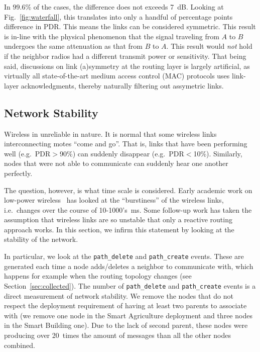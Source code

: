 \documentclass{elsarticle}
\newcommand{\building}            {Smart Building\xspace}
\newcommand{\agri}                {Smart Agriculture\xspace}
\newcommand{\pathcreate}          {{\tt path\_create}\xspace}
\newcommand{\pathdelete}          {{\tt path\_delete}\xspace}
\begin{document}
In $99.6\%$ of the cases, the difference does not exceeds 7~dB.
Looking at Fig.~\ref{fig:waterfall}, this translates into only a handful of percentage points difference in PDR.
This means the links can be considered symmetric.
This result is in-line with the physical phenomenon that the signal traveling from $A$ to $B$ undergoes the same attenuation as that from $B$ to $A$.
This result would \textit{not} hold if the neighbor radios had a different transmit power or sensitivity.
That being said, discussions on link (a)symmetry at the routing layer is largely artificial, as virtually all state-of-the-art medium access control (MAC) protocols uses link-layer acknowledgments, thereby naturally filtering out assymetric links.

\subsection{Network Stability}
\label{sec:net_stability}


Wireless in unreliable in nature.
It is normal that some wireless links interconnecting motes ``come and go''.
That is, links that have been performing well (e.g.~PDR$>$90\%) can suddenly disappear (e.g.~PDR$<$10\%).
Similarly, nodes that were not able to communicate can suddenly hear one another perfectly.


The question, however, is what time scale is considered.
Early academic work on low-power wireless~\cite{srinivasan08beta} has looked at the ``burstiness'' of the wireless links, i.e.~changes over the course of 10-1000's~ms.
Some follow-up work has taken the assumption that wireless links are so unstable that only a reactive routing approach works.
In this section, we infirm this statement by looking at the stability of the network.


In particular, we look at the \pathdelete and \pathcreate events.
These are generated each time a node adds/deletes a neighbor to communicate with, which happens for example when the routing topology changes (see Section~\ref{sec:collected}).
The number of \pathdelete and \pathcreate events is a direct measurement of network stability.
We remove the nodes that do not respect the deployment requirement of having at least two parents to associate with (we remove one node in the \agri deployment and three nodes in the \building one).
Due to the lack of second parent, these nodes were producing over 20~times the amount of messages than all the other nodes combined.
\end{document}
